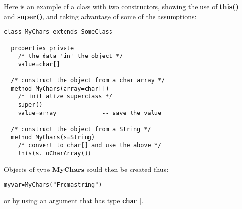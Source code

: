 Here is an example of a class with two constructors, showing the use
of \textbf{this()} and \textbf{super()}, and taking advantage of
some of the assumptions:
\begin{lstlisting}[label=mychars,caption=MyChars.nrx]
class MyChars extends SomeClass

  properties private
    /* the data 'in' the object */
    value=char[]

  /* construct the object from a char array */
  method MyChars(array=char[])
    /* initialize superclass */
    super()
    value=array             -- save the value

  /* construct the object from a String */
  method MyChars(s=String)
    /* convert to char[] and use the above */
    this(s.toCharArray())
\end{lstlisting}
 
Objects of type \textbf{MyChars} could then be created thus:
\begin{alltt}
myvar=MyChars("From a string")
\end{alltt}

or by using an argument that has type \textbf{char[]}.
